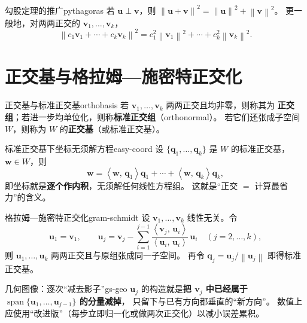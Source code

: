 \documentclass[11pt,a4paper,openany]{ctexbook}
\DeclareMathOperator{\Span}{span}
\newcommand{\norm}[1]{\left\lVert #1 \right\rVert}
\newcommand{\ip}[2]{\left\langle #1,\,#2 \right\rangle}
\begin{document}
\begin{prop}{勾股定理的推广}{pythagoras}
若 $\boldsymbol{u}\perp\boldsymbol{v}$，则
$\norm{\boldsymbol{u}+\boldsymbol{v}}^2=\norm{\boldsymbol{u}}^2+\norm{\boldsymbol{v}}^2$。
更一般地，对两两正交的 $\boldsymbol{v}_1,\dots,\boldsymbol{v}_k$，
\[
\norm{c_1\boldsymbol{v}_1+\cdots+c_k\boldsymbol{v}_k}^2
=c_1^2\norm{\boldsymbol{v}_1}^2+\cdots+c_k^2\norm{\boldsymbol{v}_k}^2.
\]
\end{prop}

\section{正交基与格拉姆—施密特正交化}

\begin{defn}{正交基与标准正交基}{orthobasis}
若 $\boldsymbol{v}_1,\dots,\boldsymbol{v}_k$ 两两正交且均非零，则称其为
\textbf{正交组}；若进一步均单位化，则称\textbf{标准正交组}（orthonormal）。
若它们还张成子空间 $W$，则称为 $W$ 的\textbf{正交基}（或标准正交基）。
\end{defn}

\begin{prop}{标准正交基下坐标无须解方程}{easy-coord}
设 $\{\boldsymbol{q}_1,\dots,\boldsymbol{q}_k\}$ 是 $W$ 的标准正交基，
$\boldsymbol{w}\in W$，则
\[
\boldsymbol{w}=\ip{\boldsymbol{w}}{\boldsymbol{q}_1}\boldsymbol{q}_1
+\cdots+\ip{\boldsymbol{w}}{\boldsymbol{q}_k}\boldsymbol{q}_k,
\]
即坐标就是\textbf{逐个作内积}，无须解任何线性方程组。
这就是“正交 $=$ 计算最省力”的含义。
\end{prop}

\begin{thm}{格拉姆—施密特正交化}{gram-schmidt}
设 $\boldsymbol{v}_1,\dots,\boldsymbol{v}_k$ 线性无关。令
\[
\boldsymbol{u}_1=\boldsymbol{v}_1,\qquad
\boldsymbol{u}_j=\boldsymbol{v}_j-\sum_{i=1}^{j-1}
\frac{\ip{\boldsymbol{v}_j}{\boldsymbol{u}_i}}{\ip{\boldsymbol{u}_i}{\boldsymbol{u}_i}}
\,\boldsymbol{u}_i\quad(j=2,\dots,k),
\]
则 $\boldsymbol{u}_1,\dots,\boldsymbol{u}_k$ 两两正交且与原组张成同一子空间。
再令 $\boldsymbol{q}_j=\boldsymbol{u}_j/\norm{\boldsymbol{u}_j}$ 即得标准正交基。
\end{thm}

\begin{remk}{几何图像：逐次“减去影子”}{gs-geo}
$\boldsymbol{u}_j$ 的构造就是\textbf{把 $\boldsymbol{v}_j$ 中已经属于
$\Span\{\boldsymbol{u}_1,\dots,\boldsymbol{u}_{j-1}\}$ 的分量减掉}，
只留下与已有方向都垂直的“新方向”。
数值上应使用“改进版”（每步立即归一化或做两次正交化）以减小误差累积。
\end{remk}
\end{document}
